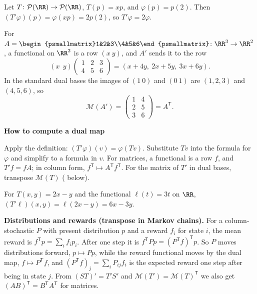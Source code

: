 \documentclass[10pt]{scrartcl}
\newcommand{\PP}{\mathcal P}\newcommand{\LL}{\mathcal L}\newcommand{\MM}{\mathcal M}\newcommand{\T}{\mathsf T}
\newenvironment{methodbox}[1]{\begin{mdframed}[style=methodstyle]\textbf{\color{NavyBlue}#1}\par\vspace{2pt}}{\end{mdframed}}
\begin{document}
\begin{example*}
  Let $T\colon\PP(\RR)\to\PP(\RR)$, $T(p)=xp$, and $\varphi(p)=p(2)$. Then $(T'\varphi)(p)=\varphi(xp)=2p(2)$, so $T'\varphi=2\varphi$.
\end{example*}

\begin{example*}
  For $A=\begin{psmallmatrix}1&2&3\\4&5&6\end{psmallmatrix}\colon\RR^3\to\RR^2$, a functional on $\RR^2$ is a row $(x\ y)$, and $A'$ sends it to the row
  \[
    (x\ \ y)\begin{pmatrix}1&2&3\\4&5&6\end{pmatrix}=(x+4y,\ 2x+5y,\ 3x+6y).
  \]
  In the standard dual bases the images of $(1\ 0)$ and $(0\ 1)$ are $(1,2,3)$ and $(4,5,6)$, so
  \[
    \MM(A')=\begin{pmatrix}1&4\\2&5\\3&6\end{pmatrix}=A^{\T}.
  \]
\end{example*}

\begin{methodbox}{How to compute a dual map}
  \begin{steps}
    \ii Apply the definition: $(T'\varphi)(v)=\varphi(Tv)$. Substitute $Tv$ into the formula for $\varphi$ and simplify to a formula in $v$.
    \ii For matrices, a functional is a row $f$, and $T'f=fA$; in column form, $f^{\T}\mapsto A^{\T}f^{\T}$.
    \ii For the matrix of $T'$ in dual bases, transpose $\MM(T)$ ( below).
  \end{steps}
\end{methodbox}

\begin{example*}
  For $T(x,y)=2x-y$ and the functional $\ell(t)=3t$ on $\RR$, $(T'\ell)(x,y)=\ell(2x-y)=6x-3y$.
\end{example*}

\textbf{Distributions and rewards (transpose in Markov chains).} For a column-stochastic $P$ with present distribution $p$ and a reward $f_i$ for state $i$, the mean reward is $f^{\T}p=\sum_if_ip_i$. After one step it is $f^{\T}Pp=(P^{\T}f)^{\T}p$. So $P$ moves distributions forward, $p\mapsto Pp$, while the reward functional moves by the dual map, $f\mapsto P^{\T}f$, and $(P^{\T}f)_j=\sum_iP_{ij}f_i$ is the expected reward one step after being in state $j$. From $(ST)'=T'S'$ and $\MM(T')=\MM(T)^{\T}$ we also get $(AB)^{\T}=B^{\T}A^{\T}$ for matrices.
\end{document}
